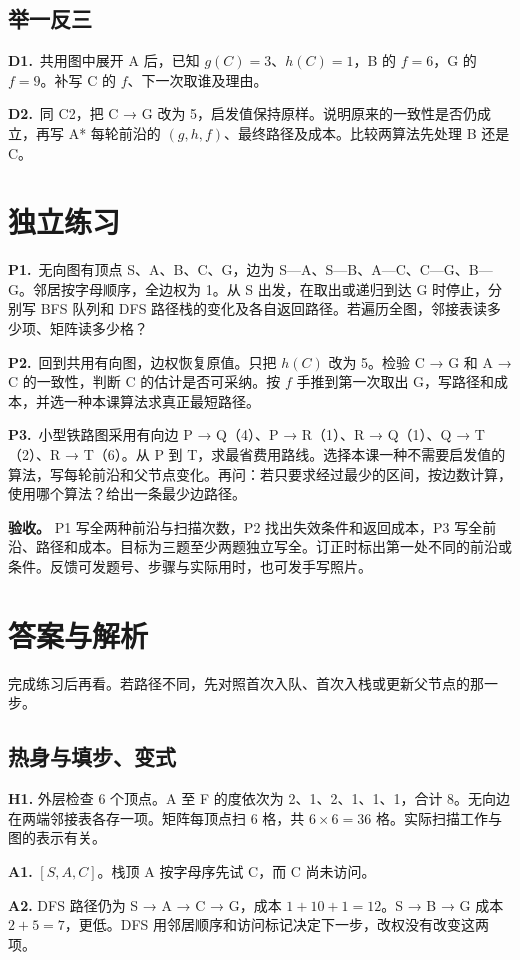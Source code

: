 \documentclass[UTF8,a4paper,11pt]{ctexart}
\newcommand{\PracticeQuestion}[3]{\par\Needspace{4\baselineskip}\noindent\begin{minipage}{\linewidth}\textbf{#1.}\ #2\par\noindent\rule{0pt}{#3mm}\par\end{minipage}\par}
\begin{document}
\subsection{举一反三}
\PracticeQuestion{D1}{共用图中展开 A 后，已知 $g(C)=3$、$h(C)=1$，B 的 $f=6$，G 的 $f=9$。补写 C 的 $f$、下一次取谁及理由。}{32}
\PracticeQuestion{D2}{同 C2，把 C → G 改为 5，启发值保持原样。说明原来的一致性是否仍成立，再写 A* 每轮前沿的 $(g,h,f)$、最终路径及成本。比较两算法先处理 B 还是 C。}{32}
\clearpage
\section{独立练习}
\PracticeQuestion{P1}{无向图有顶点 S、A、B、C、G，边为 S—A、S—B、A—C、C—G、B—G。邻居按字母顺序，全边权为 1。从 S 出发，在取出或递归到达 G 时停止，分别写 BFS 队列和 DFS 路径栈的变化及各自返回路径。若遍历全图，邻接表读多少项、矩阵读多少格？}{35}
\PracticeQuestion{P2}{回到共用有向图，边权恢复原值。只把 $h(C)$ 改为 5。检验 C → G 和 A → C 的一致性，判断 C 的估计是否可采纳。按 $f$ 手推到第一次取出 G，写路径和成本，并选一种本课算法求真正最短路径。}{35}
\PracticeQuestion{P3}{小型铁路图采用有向边 P → Q（4）、P → R（1）、R → Q（1）、Q → T（2）、R → T（6）。从 P 到 T，求最省费用路线。选择本课一种不需要启发值的算法，写每轮前沿和父节点变化。再问：若只要求经过最少的区间，按边数计算，使用哪个算法？给出一条最少边路径。}{35}
\textbf{验收。} P1 写全两种前沿与扫描次数，P2 找出失效条件和返回成本，P3 写全前沿、路径和成本。目标为三题至少两题独立写全。订正时标出第一处不同的前沿或条件。反馈可发题号、步骤与实际用时，也可发手写照片。

\clearpage
\section{答案与解析}
完成练习后再看。若路径不同，先对照首次入队、首次入栈或更新父节点的那一步。

\subsection{热身与填步、变式}
\textbf{H1.} 外层检查 6 个顶点。A 至 F 的度依次为 2、1、2、1、1、1，合计 8。无向边在两端邻接表各存一项。矩阵每顶点扫 6 格，共 $6\times6=36$ 格。实际扫描工作与图的表示有关。

\textbf{A1.} $[S,A,C]$。栈顶 A 按字母序先试 C，而 C 尚未访问。

\textbf{A2.} DFS 路径仍为 S → A → C → G，成本 $1+10+1=12$。S → B → G 成本 $2+5=7$，更低。DFS 用邻居顺序和访问标记决定下一步，改权没有改变这两项。
\end{document}
